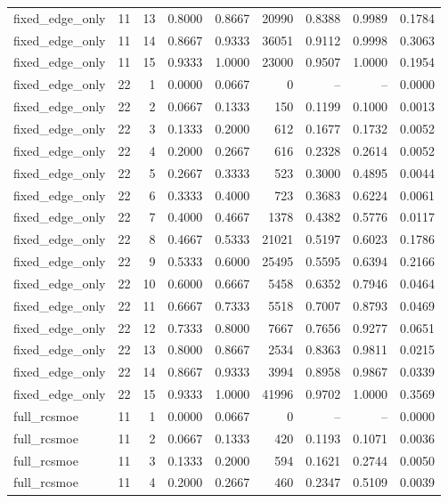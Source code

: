 \begin{tabular}{lrrrrrrrr}
fixed\_edge\_only & 11 & 13 & 0.8000 & 0.8667 & 20990 & 0.8388 & 0.9989 & 0.1784 \\
fixed\_edge\_only & 11 & 14 & 0.8667 & 0.9333 & 36051 & 0.9112 & 0.9998 & 0.3063 \\
fixed\_edge\_only & 11 & 15 & 0.9333 & 1.0000 & 23000 & 0.9507 & 1.0000 & 0.1954 \\
fixed\_edge\_only & 22 & 1 & 0.0000 & 0.0667 & 0 & -- & -- & 0.0000 \\
fixed\_edge\_only & 22 & 2 & 0.0667 & 0.1333 & 150 & 0.1199 & 0.1000 & 0.0013 \\
fixed\_edge\_only & 22 & 3 & 0.1333 & 0.2000 & 612 & 0.1677 & 0.1732 & 0.0052 \\
fixed\_edge\_only & 22 & 4 & 0.2000 & 0.2667 & 616 & 0.2328 & 0.2614 & 0.0052 \\
fixed\_edge\_only & 22 & 5 & 0.2667 & 0.3333 & 523 & 0.3000 & 0.4895 & 0.0044 \\
fixed\_edge\_only & 22 & 6 & 0.3333 & 0.4000 & 723 & 0.3683 & 0.6224 & 0.0061 \\
fixed\_edge\_only & 22 & 7 & 0.4000 & 0.4667 & 1378 & 0.4382 & 0.5776 & 0.0117 \\
fixed\_edge\_only & 22 & 8 & 0.4667 & 0.5333 & 21021 & 0.5197 & 0.6023 & 0.1786 \\
fixed\_edge\_only & 22 & 9 & 0.5333 & 0.6000 & 25495 & 0.5595 & 0.6394 & 0.2166 \\
fixed\_edge\_only & 22 & 10 & 0.6000 & 0.6667 & 5458 & 0.6352 & 0.7946 & 0.0464 \\
fixed\_edge\_only & 22 & 11 & 0.6667 & 0.7333 & 5518 & 0.7007 & 0.8793 & 0.0469 \\
fixed\_edge\_only & 22 & 12 & 0.7333 & 0.8000 & 7667 & 0.7656 & 0.9277 & 0.0651 \\
fixed\_edge\_only & 22 & 13 & 0.8000 & 0.8667 & 2534 & 0.8363 & 0.9811 & 0.0215 \\
fixed\_edge\_only & 22 & 14 & 0.8667 & 0.9333 & 3994 & 0.8958 & 0.9867 & 0.0339 \\
fixed\_edge\_only & 22 & 15 & 0.9333 & 1.0000 & 41996 & 0.9702 & 1.0000 & 0.3569 \\
full\_rcsmoe & 11 & 1 & 0.0000 & 0.0667 & 0 & -- & -- & 0.0000 \\
full\_rcsmoe & 11 & 2 & 0.0667 & 0.1333 & 420 & 0.1193 & 0.1071 & 0.0036 \\
full\_rcsmoe & 11 & 3 & 0.1333 & 0.2000 & 594 & 0.1621 & 0.2744 & 0.0050 \\
full\_rcsmoe & 11 & 4 & 0.2000 & 0.2667 & 460 & 0.2347 & 0.5109 & 0.0039 \\

\end{tabular}
